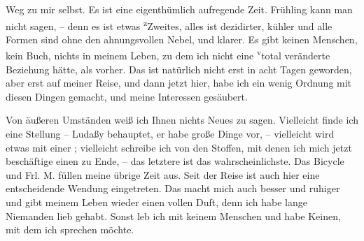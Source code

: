                Weg zu mir selbst. Es ist eine eigenthümlich aufregende Zeit. Frühling kann man nicht
               sagen, – denn es ist etwas \substVorne{}\textsuperscript{z}\substDazwischen{}Z\substHinten{}weites, alles ist dezidirter, kühler und alle Formen sind ohne den
               ahnungsvollen Nebel, und klarer. Es gibt keinen Menschen, kein Buch, nichts in meinem
               Leben, zu dem ich nicht eine \substVorne{}\textsuperscript{v}\substDazwischen{}t\substHinten{}otal veränderte Beziehung hätte, als vorher. Das ist natürlich nicht erst in
               acht Tagen geworden, aber erst auf meiner Reise, und dann jetzt hier, habe ich ein
               wenig Ordnung mit diesen Dingen gemacht, und meine Interessen gesäubert.\pend
           
\pstart
           Von äußeren Umständen weiß ich Ihnen {\pb}nichts Neues zu sagen.
               Vielleicht finde ich eine Stellung – Ludaßy
               behauptet, \strikeout{\textcolor{gray}{d}} er habe große Dinge vor, – vielleicht wird etwas mit einer \label{K_L03264-1v}\label{K_L03264-1}; vielleicht schreibe ich von den Stoffen, mit denen ich mich jetzt
               beschäftige einen zu Ende, – das letztere ist das wahrscheinlichste. \strikeout{\textcolor{gray}{×}\-\textcolor{gray}{×}\-\textcolor{gray}{×}} Das Bicycle und Frl. M. füllen meine
               übrige Zeit aus. Seit der Reise ist auch hier eine entscheidende Wendung eingetreten.
               Das macht mich auch besser und ruhiger und gibt meinem Leben wieder einen vollen
               Duft, denn ich habe lange Niemanden lieb gehabt. Sonst leb ich mit keinem Menschen
               und habe Keinen, mit dem ich sprechen möchte.\pend
           
